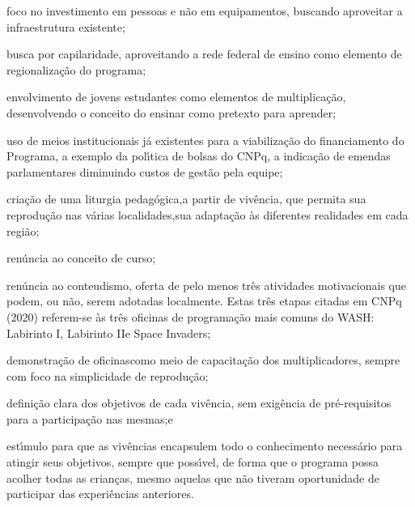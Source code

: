 \documentclass[
12pt,		%
openright,	%
twoside,  %
a4paper,			%
chapter=TITLE,		%
english,			%
french,				%
spanish,			%
brazil				%
]{USPSC-classe/USPSC}
\begin{document}
\begin{alineas}
\item \textquotedbl foco no investimento em pessoas e n\~ao em equipamentos, buscando aproveitar a infraestrutura existente;\textquotedbl 
\item \textquotedbl busca por capilaridade, aproveitando a rede federal de ensino como elemento de regionaliza\c{c}\~ao do programa;\textquotedbl 
\item \textquotedbl envolvimento de jovens estudantes como elementos de multiplica\c{c}\~ao, desenvolvendo o conceito do ensinar como pretexto para aprender;\textquotedbl 
\item \textquotedbl uso de meios institucionais j\'a existentes para a viabiliza\c{c}\~ao do financiamento do Programa, a exemplo da pol\'{\i}tica de bolsas do CNPq, a indica\c{c}\~ao de emendas parlamentares diminuindo custos de gest\~ao pela equipe;\textquotedbl 
\item \textquotedbl cria\c{c}\~ao de uma  \textquotedbl liturgia pedag\'ogica,\textquotedbl  a partir de viv\^encia, que permita sua reprodu\c{c}\~ao nas v\'arias localidades,sua adapta\c{c}\~ao \`as diferentes realidades em cada regi\~ao;\textquotedbl 
\item \textquotedbl ren\'uncia ao conceito de curso;\textquotedbl 
\item \textquotedbl ren\'uncia ao conteudismo, oferta de pelo menos tr\^es atividades motivacionais que podem, ou n\~ao, serem adotadas localmente\textquotedbl . Estas tr\^es etapas citadas em  CNPq (2020) referem-se \`as tr\^es oficinas de programa\c{c}\~ao mais comuns do WASH: \textquotedbl Labirinto I\textquotedbl , \textquotedbl Labirinto II\textquotedbl  e \textquotedbl Space Invaders\textquotedbl ;
\item \textquotedbl demonstra\c{c}\~ao de oficinas\textquotedbl  como meio de capacita\c{c}\~ao dos multiplicadores, sempre com foco na
simplicidade de reprodu\c{c}\~ao;\textquotedbl 
\item \textquotedbl defini\c{c}\~ao clara dos objetivos de cada viv\^encia, sem exig\^encia de pr\'e-requisitos para a participa\c{c}\~ao nas mesmas;\textquotedbl e
\item \textquotedbl est\'{\i}mulo para que as viv\^encias encapsulem todo o conhecimento necess\'ario para  atingir  seus objetivos, sempre que poss\'{\i}vel, de forma que o programa possa acolher todas as crian\c{c}as, mesmo aquelas que n\~ao tiveram oportunidade de participar das experi\^encias anteriores.\textquotedbl 
\end{alineas}
\end{document}
